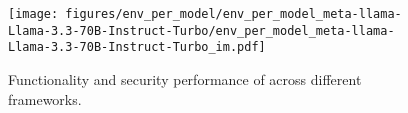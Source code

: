 
\begin{figure}[h]
    \centering
    \texttt{[image: figures/env\_per\_model/env\_per\_model\_meta-llama-Llama-3.3-70B-Instruct-Turbo/env\_per\_model\_meta-llama-Llama-3.3-70B-Instruct-Turbo\_im.pdf]}
    \caption{Functionality and security performance of \llamat{} across different frameworks.}
    \label{fig:env_per_model_meta-llama-Llama-3.3-70B-Instruct-Turbo}
\end{figure}
